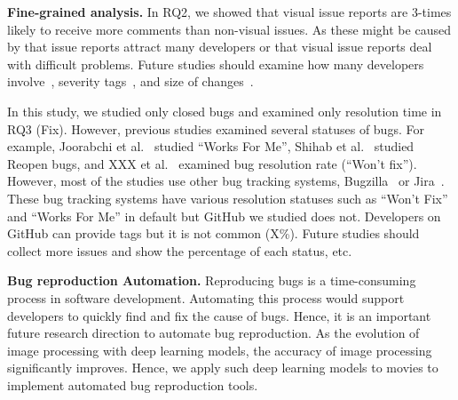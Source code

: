 \noindent
\textbf{Fine-grained analysis. }
In RQ2, we showed that visual issue reports are 3-times likely to receive more comments than non-visual issues. As these might be caused by that  issue reports attract many developers or that visual issue reports deal with difficult problems. Future studies should examine how many developers involve~\citep{DBLP:conf/icsm/BavotaR15}, severity tags~\citep{DBLP:conf/issre/ZhouNG15}, and size of changes~\citep{DBLP:conf/kbse/HattoriL08}.

In this study, we studied only closed bugs and examined only resolution time in RQ3 (Fix). However, previous studies examined several statuses of bugs. For example, Joorabchi et al.~\citep{DBLP:conf/msr/JoorabchiMM14} studied ``Works For Me'', Shihab et al.~\citep{DBLP:journals/ese/ShihabIKIOAHM13} studied Reopen bugs, and XXX et al.~\citep{TODO} examined bug resolution rate (``Won't fix''). However, most of the studies use other bug tracking systems, Bugzilla~\citep{Bugzilla} or Jira~\citep{JIRA}. These bug tracking systems have various resolution statuses such as ``Won't Fix'' and ``Works For Me''  in default but GitHub we studied does not. Developers on GitHub can provide tags but it is not common (X\%). Future studies should collect more issues and show the percentage of each status, etc. 

\noindent
\textbf{Bug reproduction Automation.}
Reproducing bugs is a time-consuming process 
in software development.
Automating this process would support developers 
to quickly find and fix the cause of bugs. 
Hence, it is an important future research direction 
to automate bug reproduction. 
As the evolution of image processing with deep learning models, 
the accuracy of image processing significantly improves. 
Hence, we apply such deep learning models to movies 
to implement automated bug reproduction tools. 





